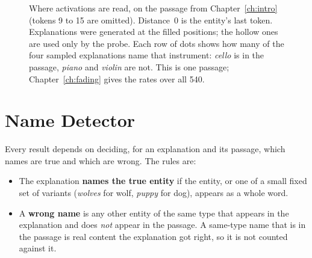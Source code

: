 \begin{figure}[t]
\centering
{}
\caption[Where activations are read, and what one passage's explanations name]{Where activations are read,
on the passage from Chapter~\ref{ch:intro} (tokens 9 to 15 are omitted). Distance~0 is the entity's last
token. Explanations were generated at the filled positions; the hollow ones are used only by the probe. Each
row of dots shows how many of the four sampled explanations name that instrument: \emph{cello} is in the
passage, \emph{piano} and \emph{violin} are not. This is one passage; Chapter~\ref{ch:fading} gives the rates
over all 540.}
\label{fig:distances}
\end{figure}

\section{Name Detector}

Every result depends on deciding, for an explanation and its passage, which names are true and which are
wrong. The rules are:

\begin{itemize}
\item The explanation \textbf{names the true entity} if the entity, or one of a small fixed set of variants
(\emph{wolves} for wolf, \emph{puppy} for dog), appears as a whole word.
\item A \textbf{wrong name} is any other entity of the same type that appears in the explanation and does
\emph{not} appear in the passage. A same-type name that is in the passage is real content the explanation
got right, so it is not counted against it.
\end{itemize}

